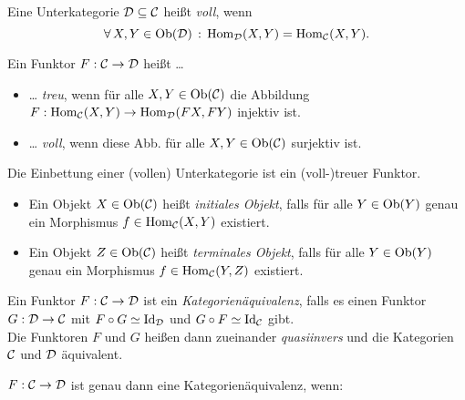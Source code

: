 \documentclass{cheat-sheet}
\begin{document}
\begin{defn}
  Eine Unterkategorie $\mathcal{D} \subseteq \mathcal{C}$ heißt \emph{voll}, wenn
  \[ \forall \, {X, Y \in \operatorname{Ob}(\mathcal{D})} \,:\, \operatorname{Hom}_{\mathcal{D}}(X, Y) = \operatorname{Hom}_{\mathcal{C}}(X, Y). \]
\end{defn}

\begin{defn}
  Ein Funktor $F : \mathcal{C} \to \mathcal{D}$ heißt \ldots
  \begin{itemize}
    \item \ldots{} \emph{treu}, wenn für alle $X, Y \in \operatorname{Ob}(\mathcal{C})$ die Abbildung
    $F : \operatorname{Hom}_{\mathcal{C}}(X, Y) \to \operatorname{Hom}_{\mathcal{D}}(FX, FY)$
    injektiv ist.
    \item \ldots{} \emph{voll}, wenn diese Abb. für alle $X, Y \in \operatorname{Ob}(\mathcal{C})$ surjektiv ist.
  \end{itemize}
\end{defn}

\begin{bem}
  Die Einbettung einer (vollen) Unterkategorie ist ein (voll-)treuer Funktor.
\end{bem}

\begin{defn}
  \begin{itemize}
    \item Ein Objekt $X \in \operatorname{Ob}(\mathcal{C})$ heißt \emph{initiales Objekt}, falls für alle $Y \in \operatorname{Ob}(Y)$ genau ein Morphismus $f \in \operatorname{Hom}_{\mathcal{C}}(X, Y)$ existiert.
    \item Ein Objekt $Z \in \operatorname{Ob}(\mathcal{C})$ heißt \emph{terminales Objekt}, falls für alle $Y \in \operatorname{Ob}(Y)$ genau ein Morphismus $f \in \operatorname{Hom}_{\mathcal{C}}(Y, Z)$ existiert.
  \end{itemize}
\end{defn}




\begin{defn}
  Ein Funktor $F : \mathcal{C} \to \mathcal{D}$ ist ein \emph{Kategorienäquivalenz}, falls es einen Funktor $G : \mathcal{D} \to \mathcal{C}$ mit $F \circ G \simeq \operatorname{Id}_{\mathcal{D}}$ und $G \circ F \simeq \operatorname{Id}_{\mathcal{C}}$ gibt. \\
  Die Funktoren $F$ und $G$ heißen dann zueinander \emph{quasiinvers} und die Kategorien $\mathcal{C}$ und $\mathcal{D}$ äquivalent.
\end{defn}


\begin{prop}
  $F : \mathcal{C} \to \mathcal{D}$ ist genau dann eine Kategorienäquivalenz, wenn:
   \quad
\end{prop}
\end{document}

